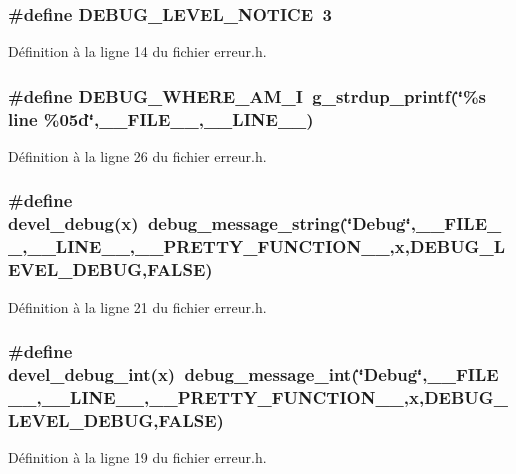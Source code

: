 \subsubsection[{DEBUG\_\-LEVEL\_\-NOTICE}]{\setlength{\rightskip}{0pt plus 5cm}\#define DEBUG\_\-LEVEL\_\-NOTICE~3}\label{erreur_8h_aa1d0c9dd70a64b98644f322b77848c7e}


Définition à la ligne 14 du fichier erreur.h.

\subsubsection[{DEBUG\_\-WHERE\_\-AM\_\-I}]{\setlength{\rightskip}{0pt plus 5cm}\#define DEBUG\_\-WHERE\_\-AM\_\-I~g\_\-strdup\_\-printf(\char`\"{}\%s line \%05d\char`\"{},\_\-\_\-FILE\_\-\_\-,\_\-\_\-LINE\_\-\_\-)}\label{erreur_8h_a7b65e07d6935901fcfcfa961f2a61fbf}


Définition à la ligne 26 du fichier erreur.h.

\subsubsection[{devel\_\-debug}]{\setlength{\rightskip}{0pt plus 5cm}\#define devel\_\-debug(x)~debug\_\-message\_\-string(\char`\"{}Debug\char`\"{},\_\-\_\-FILE\_\-\_\-,\_\-\_\-LINE\_\-\_\-,\_\-\_\-PRETTY\_\-FUNCTION\_\-\_\-,x,DEBUG\_\-LEVEL\_\-DEBUG,FALSE)}\label{erreur_8h_a17bfffc4306bc76edd79e060a8947dc4}


Définition à la ligne 21 du fichier erreur.h.

\subsubsection[{devel\_\-debug\_\-int}]{\setlength{\rightskip}{0pt plus 5cm}\#define devel\_\-debug\_\-int(x)~debug\_\-message\_\-int(\char`\"{}Debug\char`\"{},\_\-\_\-FILE\_\-\_\-,\_\-\_\-LINE\_\-\_\-,\_\-\_\-PRETTY\_\-FUNCTION\_\-\_\-,x,DEBUG\_\-LEVEL\_\-DEBUG,FALSE)}\label{erreur_8h_a10f4eeae4cc251a8d632fd62ec1057fb}


Définition à la ligne 19 du fichier erreur.h.

